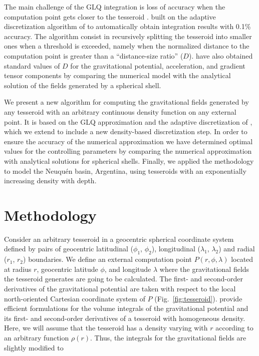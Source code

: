 \documentclass[extra, referee]{gji}
\begin{document}
The main challenge of the GLQ integration is loss of accuracy when the computation point
gets closer to the tesseroid \citep{Ku1977}.
\citet{Uieda2016} built on the adaptive discretization algorithm of \citet{Li2011}
to automatically obtain integration results with 0.1\% accuracy.
The algorithm consist in recursively splitting the tesseroid into smaller ones when a
threshold is exceeded,
namely when the normalized distance to the computation point is greater than a
``distance-size ratio'' ($D$).
\citet{Uieda2016} have also obtained standard values of $D$
for the gravitational potential, acceleration, and gradient tensor components
by comparing the numerical model with the analytical solution of the fields generated by
a spherical shell.

We present a new algorithm for computing the gravitational fields generated by any
tesseroid with an arbitrary continuous density function on any external point.
It is based on the GLQ approximation and the adaptive discretization of
\citet{Uieda2016}, which we extend to include a new density-based discretization step.
In order to ensure the accuracy of the numerical approximation we have
determined optimal values for the controlling parameters by
comparing the numerical approximation with analytical solutions for
spherical shells.
Finally, we applied the methodology to model the Neuqu\'en basin, Argentina, using
tesseroids with an exponentially increasing density with depth.



\section{Methodology}

Consider an arbitrary tesseroid in a geocentric spherical coordinate system defined by
pairs of geocentric latitudinal ($\phi_1$, $\phi_2$), longitudinal ($\lambda_1$,
$\lambda_2$) and radial ($r_1$, $r_2$) boundaries.
We define an external computation point $P(r, \phi, \lambda)$ located at radius $r$,
geocentric latitude $\phi$, and longitude $\lambda$ where the gravitational fields the
tesseroid generates are going to be calculated.
The first- and second-order derivatives of the gravitational potential are taken with
respect to the local north-oriented Cartesian coordinate system of $P$
(Fig.~\ref{fig:tesseroid}).
\citet{Grombein2013} provide efficient formulations for the volume integrals of the
gravitational potential and its first- and second-order derivatives of a tesseroid with
homogeneous density.
Here, we will assume that the tesseroid has a density varying with $r$ according to an
arbitrary function $\rho(r)$.
Thus, the integrals for the gravitational fields are slightly modified to
\end{document}
